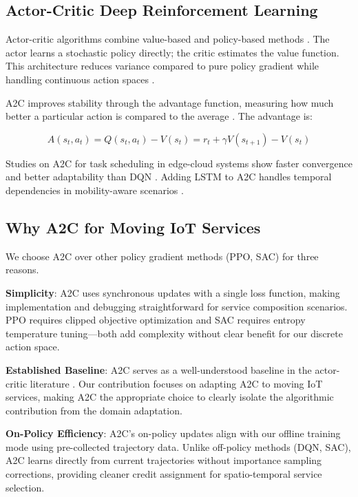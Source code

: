 \documentclass[10pt,twocolumn]{article}
\begin{document}
\subsection{Actor-Critic Deep Reinforcement Learning}\label{actor-critic-deep-reinforcement-learning}

Actor-critic algorithms combine value-based and policy-based methods
\nocite{sutton2018}. The actor learns a stochastic policy directly; the critic estimates the
value function. This architecture reduces variance compared to pure
policy gradient while handling continuous action spaces \nocite{sutton2018}.

A2C improves stability through the advantage function, measuring how
much better a particular action is compared to the average \nocite{mnih2016}. The
advantage is:

\[A(s_t, a_t) = Q(s_t, a_t) - V(s_t) = r_t + \gamma V(s_{t+1}) - V(s_t)\]

Studies on A2C for task scheduling in edge-cloud systems show faster
convergence and better adaptability than DQN \cite{chen2020}\cite{liu2024a}. Adding LSTM
to A2C handles temporal dependencies in mobility-aware scenarios
\nocite{chen2020}.

\subsection{Why A2C for Moving IoT Services}\label{why-a2c-for-moving-iot-services}

We choose A2C over other policy gradient methods (PPO, SAC) for three reasons.

\textbf{Simplicity}: A2C uses synchronous updates with a single loss
function, making implementation and debugging straightforward for
service composition scenarios. PPO requires clipped objective
optimization and SAC requires entropy temperature tuning---both add
complexity without clear benefit for our discrete action space.

\textbf{Established Baseline}: A2C serves as a well-understood baseline
in the actor-critic literature \nocite{mnih2016}. Our contribution focuses
on adapting A2C to moving IoT services, making A2C the appropriate
choice to clearly isolate the algorithmic contribution from the
domain adaptation.

\textbf{On-Policy Efficiency}: A2C's on-policy updates align with our
offline training mode using pre-collected trajectory data. Unlike
off-policy methods (DQN, SAC), A2C learns directly from current
trajectories without importance sampling corrections, providing
cleaner credit assignment for spatio-temporal service selection.
\end{document}
